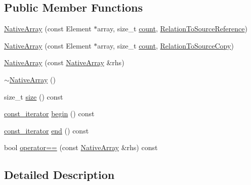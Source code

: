 \subsection*{Public Member Functions}
\begin{DoxyCompactItemize}
\item 
\hyperlink{classtesting_1_1internal_1_1_native_array_a52b3689c62532703d11e9d82939a7141}{Native\+Array} (const Element $\ast$array, size\+\_\+t \hyperlink{gmock__stress__test_8cc_afd9db40e3361ae09188795e8cbe19752}{count}, \hyperlink{structtesting_1_1internal_1_1_relation_to_source_reference}{Relation\+To\+Source\+Reference})
\item 
\hyperlink{classtesting_1_1internal_1_1_native_array_ac184ee5741af5be3402213819c834405}{Native\+Array} (const Element $\ast$array, size\+\_\+t \hyperlink{gmock__stress__test_8cc_afd9db40e3361ae09188795e8cbe19752}{count}, \hyperlink{structtesting_1_1internal_1_1_relation_to_source_copy}{Relation\+To\+Source\+Copy})
\item 
\hyperlink{classtesting_1_1internal_1_1_native_array_abb346ac3040f5da733f594cc2d5958bc}{Native\+Array} (const \hyperlink{classtesting_1_1internal_1_1_native_array}{Native\+Array} \&rhs)
\item 
\hyperlink{classtesting_1_1internal_1_1_native_array_a55ab5948d473a487303dcf6e02ad1f60}{$\sim$\+Native\+Array} ()
\item 
size\+\_\+t \hyperlink{classtesting_1_1internal_1_1_native_array_a45de2485baac8bf148e2943828094a40}{size} () const 
\item 
\hyperlink{classtesting_1_1internal_1_1_native_array_a9ce7c8408460d7158a2870456d134557}{const\+\_\+iterator} \hyperlink{classtesting_1_1internal_1_1_native_array_a49c534d29034d9230372ada54ef961bb}{begin} () const 
\item 
\hyperlink{classtesting_1_1internal_1_1_native_array_a9ce7c8408460d7158a2870456d134557}{const\+\_\+iterator} \hyperlink{classtesting_1_1internal_1_1_native_array_a4957ad1ebf7c21eab07d5e0ae2bb17aa}{end} () const 
\item 
bool \hyperlink{classtesting_1_1internal_1_1_native_array_a60af8d9c429771ee131b5ddf7e06e3c9}{operator==} (const \hyperlink{classtesting_1_1internal_1_1_native_array}{Native\+Array} \&rhs) const 
\end{DoxyCompactItemize}


\subsection{Detailed Description}
